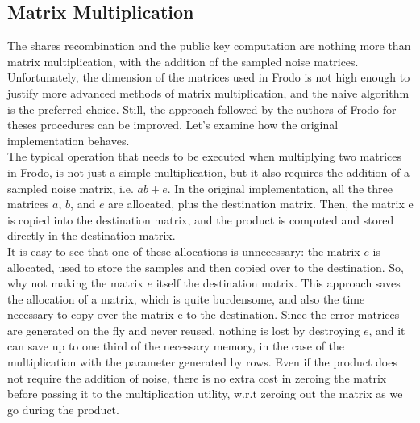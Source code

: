 \subsection{Matrix Multiplication}\label{sec:imp:mult}
The shares recombination and the public key computation are nothing more than matrix multiplication, with the addition of the sampled noise matrices. Unfortunately, the dimension of the matrices used in Frodo is not high enough to justify more advanced methods of matrix multiplication, and the naive algorithm is the preferred choice. Still, the approach followed by the authors of Frodo for theses procedures can be improved. Let's examine how the original implementation behaves.\\
The typical operation that needs to be executed when multiplying two matrices in Frodo, is not just a simple multiplication, but it also requires the addition of a sampled noise matrix, i.e. $ab + e$. In the original implementation, all the three matrices $a$, $b$, and $e$ are allocated, plus the destination matrix. Then, the matrix e is copied into the destination matrix, and the product is computed and stored directly in the destination matrix.\\
It is easy to see that one of these allocations is unnecessary: the matrix $e$ is allocated, used to store the samples and then copied over to the destination. So, why not making the matrix $e$ itself the destination matrix. This approach saves the allocation of a matrix, which is quite burdensome, and also the time necessary to copy over the matrix e to the destination. Since the error matrices are generated on the fly and never reused, nothing is lost by destroying $e$, and it can save up to one third of the necessary memory, in the case of the multiplication with the parameter generated by rows. Even if the product does not require the addition of noise, there is no extra cost in zeroing the matrix before passing it to the multiplication utility, w.r.t zeroing out the matrix as we go during the product.\\
